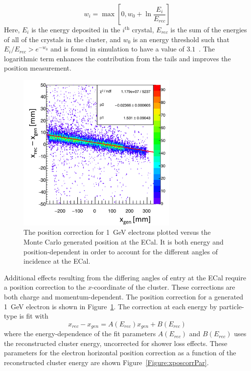 \begin{equation}
\label{eq:posnwt}
w_i  =  \max[0, w_0+\ln\dfrac{E_i}{E_{rec}}]
\end{equation}
Here, $E_i$ is the energy deposited in the $i^{\textrm{th}}$ crystal, $E_{rec}$ is the sum of the energies of all of the crystals in the cluster, and $w_0$ is an energy threshold such that $E_i/E_{rec} > e^{-w_0}$ and is found in simulation to have a value of $3.1$~\cite{szumila-vance_hps_ecal_2014}. The logarithmic term enhances the contribution from the tails and improves the position measurement.\\
\begin{figure}[htb]
  \centering
      \includegraphics[width=0.7\textwidth]{pics/performance/xposn1gev.png}
  \caption[Horizontal position correction for 1~GeV electrons]{The position correction for 1~GeV electrons plotted versus the Monte Carlo generated position at the ECal. It is both energy and position-dependent in order to account for the different angles of incidence at the ECal.}
  \label{Figure:xposn1gev}
\end{figure}
\indent Additional effects resulting from the differing angles of entry at the ECal require a position correction to the $x$-coordinate of the cluster. These corrections are both charge and momentum-dependent. The position correction for a generated 1~GeV electron is shown in Figure~\ref{Figure:xposn1gev}. The correction at each energy by particle-type is fit with
\begin{equation}
\label{eq:posncorr}
x_{rec} - x_{gen} = A(E_{rec}) x_{gen} + B(E_{rec})
\end{equation}
where the energy-dependence of the fit parameters $A(E_{rec})$ and $B(E_{rec})$ uses the reconstructed cluster energy, uncorrected for shower loss effects. These parameters for the electron horizontal position correction as a function of the reconstructed cluster energy are shown Figure~\ref{Figure:xposcorrPar}.

